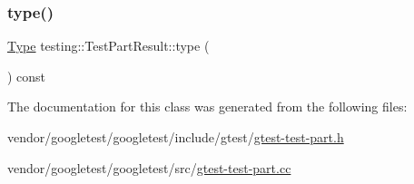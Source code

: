 \mbox{\label{classtesting_1_1_test_part_result_aab92b225e8a472e78bd3889ca6df0d2a}} 
\subsubsection{\texorpdfstring{type()}{type()}}
{\footnotesize\ttfamily \hyperlink{classtesting_1_1_test_part_result_a65ae656b33fdfdfffaf34858778a52d5}{Type} testing\+::\+Test\+Part\+Result\+::type (\begin{DoxyParamCaption}{ }\end{DoxyParamCaption}) const\hspace{0.3cm}{\ttfamily [inline]}}



The documentation for this class was generated from the following files\+:\begin{DoxyCompactItemize}
\item 
vendor/googletest/googletest/include/gtest/\hyperlink{gtest-test-part_8h}{gtest-\/test-\/part.\+h}\item 
vendor/googletest/googletest/src/\hyperlink{gtest-test-part_8cc}{gtest-\/test-\/part.\+cc}\end{DoxyCompactItemize}
